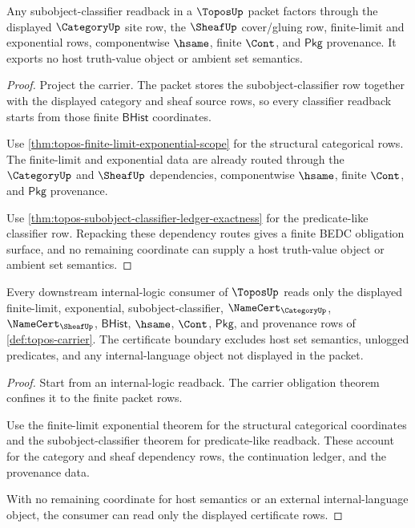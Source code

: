 \begin{theorem}
\label{thm:topos-site-sheaf-classifier-obligation}
Any subobject-classifier readback in a $\ToposUp$ packet factors through the
displayed $\CategoryUp$ site row, the $\SheafUp$ cover/gluing row, finite-limit
and exponential rows, componentwise $\hsame$, finite $\Cont$, and
$\mathsf{Pkg}$ provenance. It exports no host truth-value object or ambient set
semantics.
\end{theorem}
\begin{proof}
Project the carrier. The packet stores the subobject-classifier row together
with the displayed category and sheaf source rows, so every classifier readback
starts from those finite $\mathsf{BHist}$ coordinates.

Use \autoref{thm:topos-finite-limit-exponential-scope} for the structural
categorical rows. The finite-limit and exponential data are already routed
through the $\CategoryUp$ and $\SheafUp$ dependencies, componentwise $\hsame$,
finite $\Cont$, and $\mathsf{Pkg}$ provenance.

Use \autoref{thm:topos-subobject-classifier-ledger-exactness} for the
predicate-like classifier row. Repacking these dependency routes gives a finite
BEDC obligation surface, and no remaining coordinate can supply a host
truth-value object or ambient set semantics.
\end{proof}

\begin{theorem}
\label{thm:topos-certificate-boundary}
Every downstream internal-logic consumer of $\ToposUp$ reads only the displayed finite-limit, exponential, subobject-classifier, $\NameCert_{\CategoryUp}$, $\NameCert_{\SheafUp}$, $\mathsf{BHist}$, $\hsame$, $\Cont$, $\mathsf{Pkg}$, and provenance rows of \autoref{def:topos-carrier}. The certificate boundary excludes host set semantics, unlogged predicates, and any internal-language object not displayed in the packet.
\end{theorem}
\begin{proof}
Start from an internal-logic readback. The carrier obligation theorem confines it to the finite packet rows.

Use the finite-limit exponential theorem for the structural categorical coordinates and the subobject-classifier theorem for predicate-like readback. These account for the category and sheaf dependency rows, the continuation ledger, and the provenance data.

With no remaining coordinate for host semantics or an external internal-language object, the consumer can read only the displayed certificate rows.
\end{proof}

